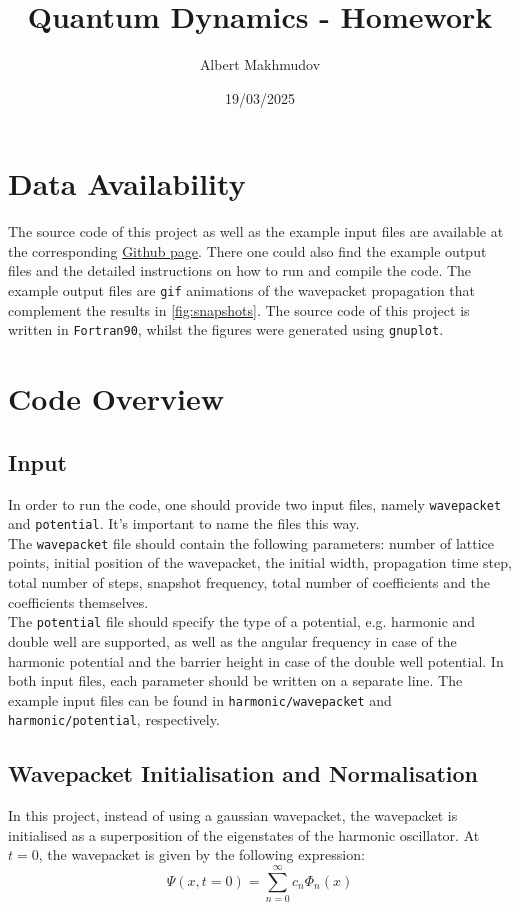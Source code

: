 \documentclass[12pt]{article}
\title{Quantum Dynamics - Homework}
\author{Albert Makhmudov}
\date{19/03/2025}
\begin{document}
\maketitle

\section*{Data Availability}
The source code of this project as well as the example input files are available at the corresponding \href{https://github.com/almakhmudov/LTTC-Homework--QD}{Github page}. There one could also find the example output files and the detailed instructions on how to run and compile the code. The example output files are \texttt{gif} animations of the wavepacket propagation that complement the results in \autoref{fig:snapshots}. The source code of this project is written in \texttt{Fortran90}, whilst the figures were generated using \texttt{gnuplot}.

\section*{Code Overview}

\subsection*{Input}
In order to run the code, one should provide two input files, namely \texttt{wavepacket} and \texttt{potential}. It's important to name the files this way. \\

The \texttt{wavepacket} file should contain the following parameters: number of lattice points, initial position of the wavepacket, the initial width, propagation time step, total number of steps, snapshot frequency, total number of coefficients and the coefficients themselves. \\

The \texttt{potential} file should specify the type of a potential, e.g. harmonic and double well are supported, as well as the angular frequency in case of the harmonic potential and the barrier height in case of the double well potential. In both input files, each parameter should be written on a separate line. The example input files can be found in \texttt{harmonic/wavepacket} and \texttt{harmonic/potential}, respectively. \\

\subsection*{Wavepacket Initialisation and Normalisation}
In this project, instead of using a gaussian wavepacket, the wavepacket is initialised as a superposition of the eigenstates of the harmonic oscillator. At $t = 0$, the wavepacket is given by the following expression:
\begin{equation}
    \Psi(x, t = 0) = \sum_{n=0}^{\infty} c_n \Phi_n(x)
\label{eq:wavepacket}
\end{equation}
\end{document}

